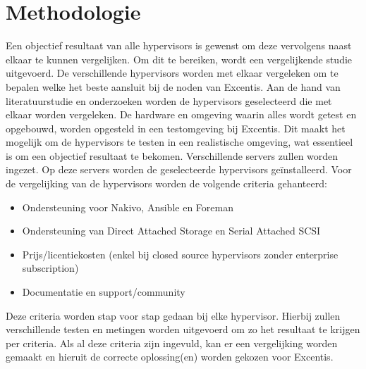 

\section{Methodologie}%
\label{sec:methodologie}
Een objectief resultaat van alle hypervisors is gewenst om deze vervolgens naast elkaar te kunnen vergelijken. Om dit te bereiken, wordt een vergelijkende studie uitgevoerd. De verschillende hypervisors worden met elkaar vergeleken om te bepalen welke het beste aansluit bij de noden van Excentis.
Aan de hand van literatuurstudie en onderzoeken worden de hypervisors geselecteerd die met elkaar worden vergeleken.
De hardware en omgeving waarin alles wordt getest en opgebouwd, worden opgesteld in een testomgeving bij Excentis. Dit maakt het mogelijk om de hypervisors te testen in een realistische omgeving, wat essentieel is om een objectief resultaat te bekomen.
Verschillende servers zullen worden ingezet. Op deze servers worden de geselecteerde hypervisors geïnstalleerd.
Voor de vergelijking van de hypervisors worden de volgende criteria gehanteerd:
\begin{itemize}
\item Ondersteuning voor Nakivo, Ansible en Foreman
\item Ondersteuning van Direct Attached Storage en Serial Attached SCSI
\item Prijs/licentiekosten (enkel bij closed source hypervisors zonder enterprise subscription)
\item Documentatie en support/community
\end{itemize}
Deze criteria worden stap voor stap gedaan bij elke hypervisor. Hierbij zullen verschillende testen en metingen worden uitgevoerd om zo het resultaat te krijgen per criteria.
Als al deze criteria zijn ingevuld, kan er een vergelijking worden gemaakt en hieruit de correcte oplossing(en) worden gekozen voor Excentis.

